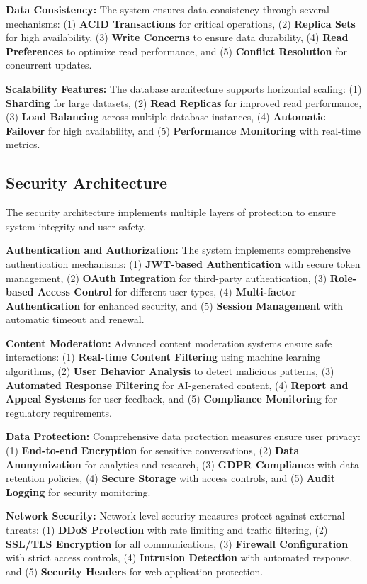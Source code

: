 \documentclass[conference]{IEEEtran}
\begin{document}
\textbf{Data Consistency:} The system ensures data consistency through several mechanisms: (1) \textbf{ACID Transactions} for critical operations, (2) \textbf{Replica Sets} for high availability, (3) \textbf{Write Concerns} to ensure data durability, (4) \textbf{Read Preferences} to optimize read performance, and (5) \textbf{Conflict Resolution} for concurrent updates.

\textbf{Scalability Features:} The database architecture supports horizontal scaling: (1) \textbf{Sharding} for large datasets, (2) \textbf{Read Replicas} for improved read performance, (3) \textbf{Load Balancing} across multiple database instances, (4) \textbf{Automatic Failover} for high availability, and (5) \textbf{Performance Monitoring} with real-time metrics.

\subsection{Security Architecture}
The security architecture implements multiple layers of protection to ensure system integrity and user safety.

\textbf{Authentication and Authorization:} The system implements comprehensive authentication mechanisms: (1) \textbf{JWT-based Authentication} with secure token management, (2) \textbf{OAuth Integration} for third-party authentication, (3) \textbf{Role-based Access Control} for different user types, (4) \textbf{Multi-factor Authentication} for enhanced security, and (5) \textbf{Session Management} with automatic timeout and renewal.

\textbf{Content Moderation:} Advanced content moderation systems ensure safe interactions: (1) \textbf{Real-time Content Filtering} using machine learning algorithms, (2) \textbf{User Behavior Analysis} to detect malicious patterns, (3) \textbf{Automated Response Filtering} for AI-generated content, (4) \textbf{Report and Appeal Systems} for user feedback, and (5) \textbf{Compliance Monitoring} for regulatory requirements.

\textbf{Data Protection:} Comprehensive data protection measures ensure user privacy: (1) \textbf{End-to-end Encryption} for sensitive conversations, (2) \textbf{Data Anonymization} for analytics and research, (3) \textbf{GDPR Compliance} with data retention policies, (4) \textbf{Secure Storage} with access controls, and (5) \textbf{Audit Logging} for security monitoring.

\textbf{Network Security:} Network-level security measures protect against external threats: (1) \textbf{DDoS Protection} with rate limiting and traffic filtering, (2) \textbf{SSL/TLS Encryption} for all communications, (3) \textbf{Firewall Configuration} with strict access controls, (4) \textbf{Intrusion Detection} with automated response, and (5) \textbf{Security Headers} for web application protection.
\end{document}
